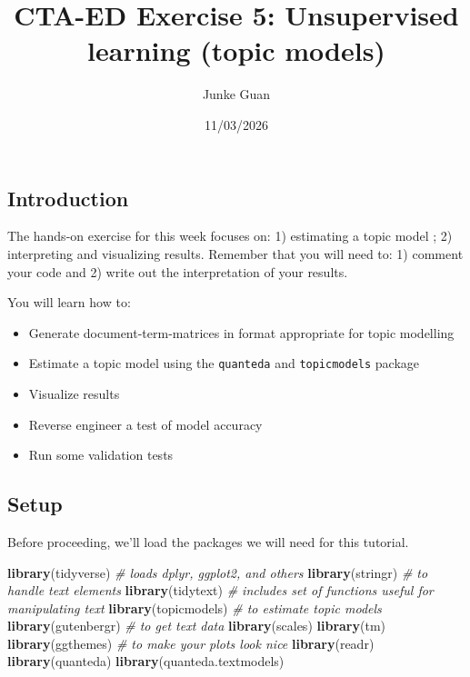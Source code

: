 \documentclass[
]{article}
\title{CTA-ED Exercise 5: Unsupervised learning (topic models)}
\author{Junke Guan}
\date{11/03/2026}
\newenvironment{Shaded}{\begin{snugshade}}{\end{snugshade}}
\newcommand{\CommentTok}[1]{\textcolor[rgb]{0.56,0.35,0.01}{\textit{#1}}}
\newcommand{\FunctionTok}[1]{\textcolor[rgb]{0.13,0.29,0.53}{\textbf{#1}}}
\newcommand{\NormalTok}[1]{#1}
\providecommand{\tightlist}{%
  \setlength{\itemsep}{0pt}\setlength{\parskip}{0pt}}
\begin{document}
\maketitle

\subsection{Introduction}\label{introduction}

The hands-on exercise for this week focuses on: 1) estimating a topic
model ; 2) interpreting and visualizing results. Remember that you will
need to: 1) comment your code and 2) write out the interpretation of
your results.

You will learn how to:

\begin{itemize}
\tightlist
\item
  Generate document-term-matrices in format appropriate for topic
  modelling
\item
  Estimate a topic model using the \texttt{quanteda} and
  \texttt{topicmodels} package
\item
  Visualize results
\item
  Reverse engineer a test of model accuracy
\item
  Run some validation tests
\end{itemize}

\subsection{Setup}\label{setup}

Before proceeding, we'll load the packages we will need for this
tutorial.

\begin{Shaded}
\begin{Highlighting}[]
\FunctionTok{library}\NormalTok{(tidyverse) }\CommentTok{\# loads dplyr, ggplot2, and others}
\FunctionTok{library}\NormalTok{(stringr) }\CommentTok{\# to handle text elements}
\FunctionTok{library}\NormalTok{(tidytext) }\CommentTok{\# includes set of functions useful for manipulating text}
\FunctionTok{library}\NormalTok{(topicmodels) }\CommentTok{\# to estimate topic models}
\FunctionTok{library}\NormalTok{(gutenbergr) }\CommentTok{\# to get text data}
\FunctionTok{library}\NormalTok{(scales)}
\FunctionTok{library}\NormalTok{(tm)}
\FunctionTok{library}\NormalTok{(ggthemes) }\CommentTok{\# to make your plots look nice}
\FunctionTok{library}\NormalTok{(readr)}
\FunctionTok{library}\NormalTok{(quanteda)}
\FunctionTok{library}\NormalTok{(quanteda.textmodels)}
\end{Highlighting}
\end{Shaded}
\end{document}
